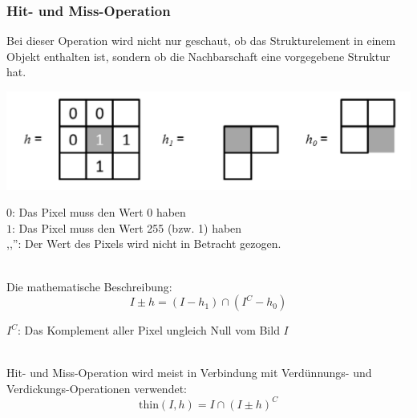 \subsubsection{Hit- und Miss-Operation}
Bei dieser Operation wird nicht nur geschaut, ob das Strukturelement in einem Objekt enthalten ist, sondern ob die Nachbarschaft eine vorgegebene Struktur hat.
\begin{center}
	\includegraphics[scale=0.5]{./images/hitmiss.png}
\end{center}
\begin{footnotesize}
	$0$: Das Pixel muss den Wert 0 haben\\
	$1$: Das Pixel muss den Wert 255 (bzw. 1) haben\\
	,,'': Der Wert des Pixels wird nicht in Betracht gezogen.\\
\end{footnotesize}
\\
Die mathematische Beschreibung:
\[
	I \pm h = (I - h_1) \cap (I^C - h_0)
\]
\begin{footnotesize}
	$I^C$: Das Komplement aller Pixel ungleich Null vom Bild $I$\\
\end{footnotesize}
\\
Hit- und Miss-Operation wird meist in Verbindung mit Verdünnungs- und Verdickungs-Operationen verwendet:
\[
	\text{thin}(I,h) = I \cap (I \pm h)^C
\]